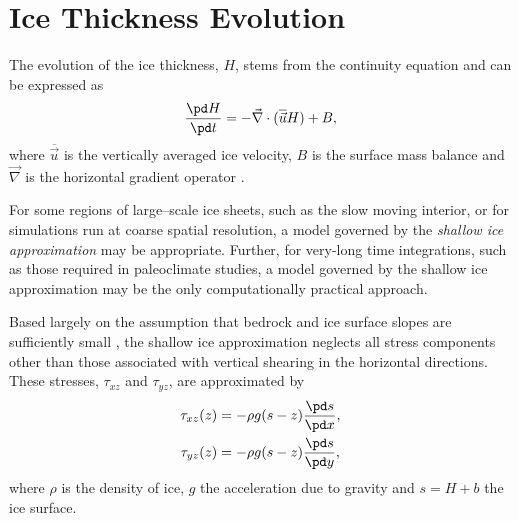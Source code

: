 \section{Ice Thickness Evolution}
\label{sc:glide_thickness_evolution}
The evolution of the ice thickness, $H$, stems from the continuity equation and can be expressed as
\begin{equation}
  \label{kin.eq.ice_thickness}
  \frac{\pd H}{\pd t} = -\vec\nabla\cdot(\overline{\vec{u}} H) + B,
\end{equation}
where $\overline{\vec{u}}$ is the vertically averaged ice velocity, $B$ is the surface mass balance and $\vec\nabla$ is the horizontal gradient operator \citep{Payne1997}. 

For some regions of large--scale ice sheets, such as the slow moving interior, or for simulations run at coarse spatial resolution, a model governed by the \emph{shallow ice approximation} may be appropriate. Further, for very-long time integrations, such as those required in paleoclimate studies, a model governed by the shallow ice approximation may
be the only computationally practical approach.

Based largely on the assumption that bedrock and ice surface slopes are sufficiently small \citep{Hutter1983}, the shallow ice approximation neglects all stress components other than those associated with vertical shearing in the horizontal directions. 
These stresses, $\tau_{xz}$ and $\tau_{yz}$, are approximated by
\begin{equation}
  \label{kin.eq.horiz_shear}
  \begin{split}
    \tau_{xz}(z)&=-\rho g(s-z)\frac{\pd s}{\pd x},\\
    \tau_{yz}(z)&=-\rho g(s-z)\frac{\pd s}{\pd y},
  \end{split}
\end{equation}
where $\rho$ is the density of ice, $g$ the acceleration due to gravity and $s=H+b$ the ice surface. 

